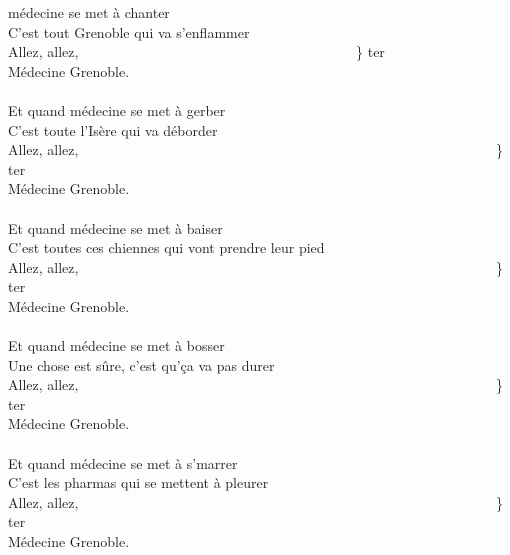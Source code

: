
médecine se met à chanter
\\C'est tout Grenoble qui va s'enflammer
\\Allez, allez, ~~~~~~~~~~~~~~~~~~~~~~~~~~~~~~~~~~~~~~~\} ter
\\Médecine Grenoble.
\\\\Et quand médecine se met à gerber
\\C'est toute l'Isère qui va déborder
\\Allez, allez, ~~~~~~~~~~~~~~~~~~~~~~~~~~~~~~~~~~~~~~~~~~~~~~~~~~~~~~~~~~~\} ter
\\Médecine Grenoble.
\\\\Et quand médecine se met à baiser
\\C'est toutes ces chiennes qui vont prendre leur pied
\\Allez, allez, ~~~~~~~~~~~~~~~~~~~~~~~~~~~~~~~~~~~~~~~~~~~~~~~~~~~~~~~~~~~\} ter
\\Médecine Grenoble.
\\\\Et quand médecine se met à bosser
\\Une chose est sûre, c'est qu'ça va pas durer
\\Allez, allez, ~~~~~~~~~~~~~~~~~~~~~~~~~~~~~~~~~~~~~~~~~~~~~~~~~~~~~~~~~~~\} ter
\\Médecine Grenoble.
\\\\Et quand médecine se met à s'marrer
\\C'est les pharmas qui se mettent à pleurer
\\Allez, allez, ~~~~~~~~~~~~~~~~~~~~~~~~~~~~~~~~~~~~~~~~~~~~~~~~~~~~~~~~~~~\} ter
\\Médecine Grenoble.
\\
\breakpage
